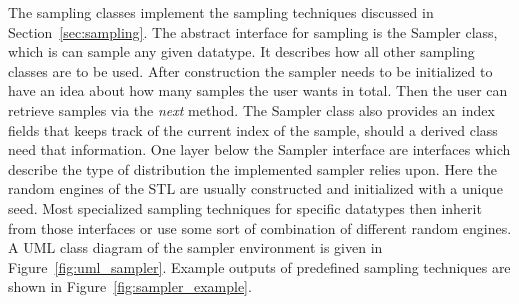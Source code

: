 \documentclass[a4paper,10pt]{article}
\newcommand{\secref}[1]{Section~\ref{#1}}
\newcommand{\figref}[1]{Figure~\ref{#1}}
\begin{document}
    The sampling classes implement the sampling techniques discussed in
    \secref{sec:sampling}.
    The abstract interface for sampling is the Sampler class, which is can
    sample any given datatype.
    It describes how all other sampling classes are to be used.
    After construction the sampler needs to be initialized to
    have an idea about how many samples the user wants in total.
    Then the user can retrieve samples via the \emph{next} method.
    The Sampler class also provides an index fields that keeps track
    of the current index of the sample, should a derived class need that
    information.
    One layer below the Sampler interface are interfaces which 
    describe the type of distribution the implemented sampler
    relies upon.
    Here the random engines of the STL are usually constructed and
    initialized with a unique seed.
    Most specialized sampling techniques for specific datatypes then
    inherit from those interfaces or use some sort of combination
    of different random engines.
    A UML class diagram of the sampler environment is given in 
    \figref{fig:uml_sampler}.
    Example outputs of predefined sampling techniques are shown in
    \figref{fig:sampler_example}.
\end{document}
